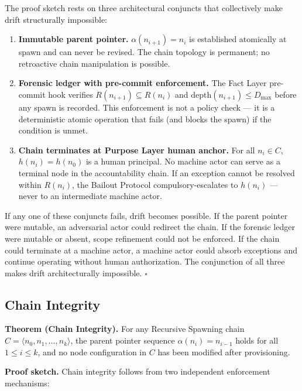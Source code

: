 \medskip
The proof sketch rests on three architectural conjuncts that collectively make drift structurally impossible:

\begin{enumerate}
    \item[(1)] \textbf{Immutable parent pointer.} $\alpha(n_{i+1}) = n_i$ is established atomically at spawn and can never be revised. The chain topology is permanent; no retroactive chain manipulation is possible.
    \item[(2)] \textbf{Forensic ledger with pre-commit enforcement.} The Fact Layer pre-commit hook verifies $R(n_{i+1}) \subseteq R(n_i)$ and $\text{depth}(n_{i+1}) \leq D_{\max}$ before any spawn is recorded. This enforcement is not a policy check — it is a deterministic atomic operation that fails (and blocks the spawn) if the condition is unmet.
    \item[(3)] \textbf{Chain terminates at Purpose Layer human anchor.} For all $n_i \in C$, $h(n_i) = h(n_0)$ is a human principal. No machine actor can serve as a terminal node in the accountability chain. If an exception cannot be resolved within $R(n_i)$, the Bailout Protocol compulsory-escalates to $h(n_i)$ — never to an intermediate machine actor.
\end{enumerate}

If any one of these conjuncts fails, drift becomes possible. If the parent pointer were mutable, an adversarial actor could redirect the chain. If the forensic ledger were mutable or absent, scope refinement could not be enforced. If the chain could terminate at a machine actor, a machine actor could absorb exceptions and continue operating without human authorization. The conjunction of all three makes drift architecturally impossible. $\square$

\subsection{Chain Integrity}
\label{sec:rs-chain-integrity}

\medskip
\noindent\textbf{Theorem (Chain Integrity).} For any Recursive Spawning chain $C = \langle n_0, n_1, \ldots, n_k \rangle$, the parent pointer sequence $\alpha(n_i) = n_{i-1}$ holds for all $1 \leq i \leq k$, and no node configuration in $C$ has been modified after provisioning.

\medskip
\noindent\textbf{Proof sketch.} Chain integrity follows from two independent enforcement mechanisms:

